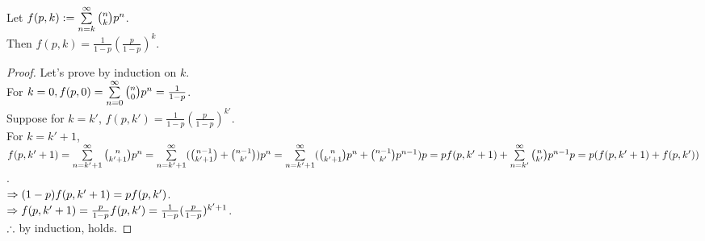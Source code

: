 
\begin{lm}
\label{lm0}
Let $f(p, k):=\sum\limits_{n=k}^\infty\binom nkp^n$.\\
Then $f(p, k)=\frac1{1-p}(\frac p{1-p})^k$.
\begin{proof}
Let's prove by induction on $k$.\\
For $k=0, f(p, 0)=\sum\limits_{n=0}^\infty\binom n0p^n=\frac1{1-p}$.\\
Suppose for $k=k'$, $f(p, k')=\frac1{1-p}(\frac p{1-p})^{k'}$.\\
For $k=k'+1$, $f(p, k'+1)=\sum\limits_{n=k'+1}^\infty\binom n{k'+1}p^n=\sum\limits_{n=k'+1}^\infty(\binom{n-1}{k'+1}+\binom{n-1}{k'})p^n=\sum\limits_{n=k'+1}^\infty(\binom n{k'+1}p^n+\binom{n-1}{k'}p^{n-1})p=pf(p, k'+1)+\sum\limits_{n=k'}^\infty\binom n{k'}p^{n-1}p=p(f(p, k'+1)+f(p, k'))$.\\
$\Rightarrow(1-p)f(p, k'+1)=pf(p, k')$.\\
$\Rightarrow f(p, k'+1)=\frac p{1-p}f(p, k')=\frac1{1-p}(\frac p{1-p})^{k'+1}$.\\
$\therefore$ by induction,  holds.
\end{proof}
\end{lm}
